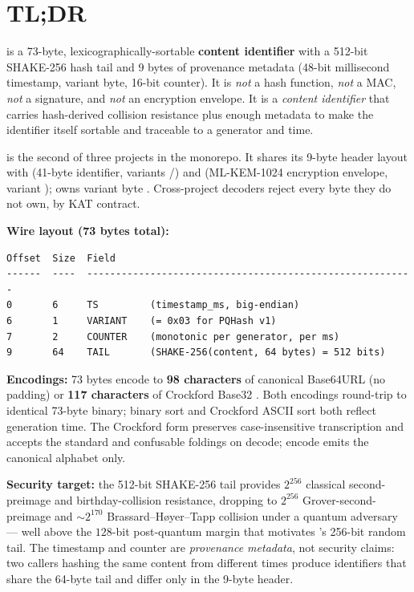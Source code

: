 \section*{TL;DR}

\pqhash{} is a 73-byte, lexicographically-sortable \textbf{content identifier} with a 512-bit SHAKE-256 \citep{fips202} hash tail and 9 bytes of provenance metadata (48-bit millisecond timestamp, variant byte, 16-bit counter). It is \emph{not} a hash function, \emph{not} a MAC, \emph{not} a signature, and \emph{not} an encryption envelope. It is a \emph{content identifier} that carries hash-derived collision resistance plus enough metadata to make the identifier itself sortable and traceable to a generator and time.

\pqhash{} is the second of three projects in the \pqtoolkit{} monorepo. It shares its 9-byte header layout with \pqid{} \citep{rfc4648,grover1996} (41-byte identifier, variants /) and \pqcrypt{} (ML-KEM-1024 \citep{fips203} encryption envelope, variant ); \pqhash{} owns variant byte . Cross-project decoders reject every byte they do not own, by KAT contract.

\textbf{Wire layout (73 bytes total):}
\begin{lstlisting}[language=Pseudocode]
Offset  Size  Field
------  ----  ---------------------------------------------------------
0       6     TS         (timestamp_ms, big-endian)
6       1     VARIANT    (= 0x03 for PQHash v1)
7       2     COUNTER    (monotonic per generator, per ms)
9       64    TAIL       (SHAKE-256(content, 64 bytes) = 512 bits)
\end{lstlisting}

\textbf{Encodings:} 73 bytes encode to \textbf{98 characters} of canonical Base64URL \citep{rfc4648} (no padding) or \textbf{117 characters} of Crockford Base32 \citep{crockford}. Both encodings round-trip to identical 73-byte binary; binary sort and Crockford ASCII sort both reflect generation time. The Crockford form preserves case-insensitive transcription and accepts the standard  and  confusable foldings on decode; encode emits the canonical alphabet only.

\textbf{Security target:} the 512-bit SHAKE-256 tail provides $2^{256}$ classical second-preimage and birthday-collision resistance, dropping to $2^{256}$ Grover-second-preimage \citep{grover1996} and $\sim 2^{170}$ Brassard--H{\o}yer--Tapp \citep{bht1998} collision under a quantum adversary --- well above the $128$-bit post-quantum margin that motivates \pqid{}'s 256-bit random tail. The timestamp and counter are \emph{provenance metadata}, not security claims: two callers hashing the same content from different times produce identifiers that share the 64-byte tail and differ only in the 9-byte header.

